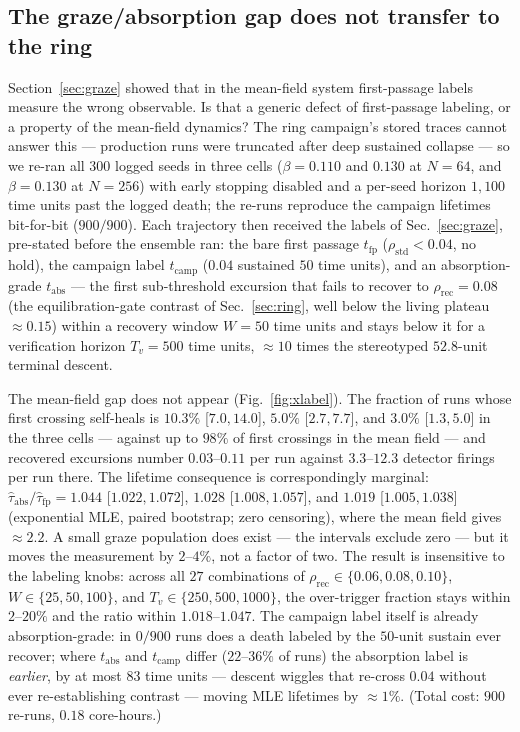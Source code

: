 \documentclass[pdflatex,sn-mathphys,Numbered]{sn-jnl}
\begin{document}
\subsection{The graze/absorption gap does not transfer to the ring}
\label{sec:ring:xlabel}

Section~\ref{sec:graze} showed that in the mean-field system first-passage
labels measure the wrong observable. Is that a generic defect of
first-passage labeling, or a property of the mean-field dynamics? The ring
campaign's stored traces cannot answer this --- production runs were
truncated after deep sustained collapse --- so we re-ran all $300$ logged
seeds in three cells ($\beta = 0.110$ and $0.130$ at $N = 64$, and
$\beta = 0.130$ at $N = 256$) with early stopping disabled and a per-seed
horizon $1{,}100$ time units past the logged death; the re-runs reproduce
the campaign lifetimes bit-for-bit ($900/900$). Each trajectory then
received the labels of Sec.~\ref{sec:graze}, pre-stated before the ensemble
ran: the bare first passage $t_{\mathrm{fp}}$
($\rho_{\mathrm{std}} < 0.04$, no hold), the campaign label
$t_{\mathrm{camp}}$ ($0.04$ sustained $50$ time units), and an
absorption-grade $t_{\mathrm{abs}}$ --- the first sub-threshold excursion
that fails to recover to $\rho_{\mathrm{rec}} = 0.08$ (the equilibration-gate
contrast of Sec.~\ref{sec:ring}, well below the living plateau
${\approx}0.15$) within a recovery window $W = 50$ time units and stays
below it for a verification horizon $T_v = 500$ time units, ${\approx}10$
times the stereotyped $52.8$-unit terminal descent.

The mean-field gap does not appear (Fig.~\ref{fig:xlabel}). The fraction of
runs whose first crossing self-heals is $10.3\%$ [$7.0, 14.0$], $5.0\%$
[$2.7, 7.7$], and $3.0\%$ [$1.3, 5.0$] in the three cells --- against up to
$98\%$ of first crossings in the mean field --- and recovered excursions
number $0.03$--$0.11$ per run against $3.3$--$12.3$ detector firings per
run there. The lifetime consequence is correspondingly marginal:
$\hat\tau_{\mathrm{abs}}/\hat\tau_{\mathrm{fp}} = 1.044$ [$1.022, 1.072$],
$1.028$ [$1.008, 1.057$], and $1.019$ [$1.005, 1.038$] (exponential MLE,
paired bootstrap; zero censoring), where the mean field gives
${\approx}2.2$. A small graze population does exist --- the intervals
exclude zero --- but it moves the measurement by $2$--$4\%$, not a factor
of two. The result is insensitive to the labeling knobs: across all $27$
combinations of $\rho_{\mathrm{rec}} \in \{0.06, 0.08, 0.10\}$,
$W \in \{25, 50, 100\}$, and $T_v \in \{250, 500, 1000\}$, the over-trigger
fraction stays within $2$--$20\%$ and the ratio within $1.018$--$1.047$.
The campaign label itself is already absorption-grade: in $0/900$ runs does
a death labeled by the $50$-unit sustain ever recover; where
$t_{\mathrm{abs}}$ and $t_{\mathrm{camp}}$ differ ($22$--$36\%$ of runs)
the absorption label is \emph{earlier}, by at most $83$ time units ---
descent wiggles that re-cross $0.04$ without ever re-establishing contrast
--- moving MLE lifetimes by ${\approx}1\%$. (Total cost: $900$ re-runs,
$0.18$ core-hours.)
\end{document}
